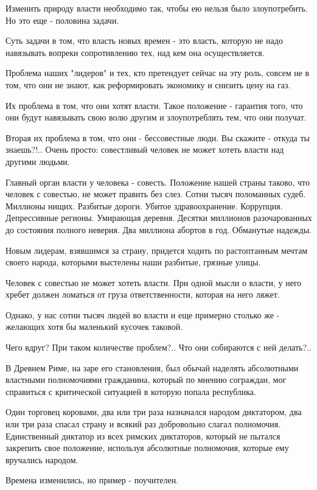 Изменить природу власти необходимо так, чтобы ею нельзя было злоупотребить. Но
это еще - половина задачи. 

Суть задачи в том, что власть новых времен - это власть, которую не надо
навязывать вопреки сопротивлению тех, над кем она осуществляется.

Проблема наших "лидеров" и тех, кто претендует сейчас на эту роль, совсем не в
том, что они не знают, как реформировать экономику и снизить цену на газ. 

Их проблема в том, что они хотят власти. Такое положение - гарантия того, что
они будут навязывать свою волю другим и злоупотреблять тем, что они получат. 

Вторая их проблема в том, что они - бессовестные люди. Вы скажите - откуда ты
знаешь?!.. Очень просто: совестливый человек не может хотеть власти над другими
людьми. 

Главный орган власти у человека - совесть. Положение нашей страны таково, что
человек с совестью, не может править без слез. Сотни тысяч поломанных судеб.
Миллионы нищих. Разбитые дороги. Убитое здравоохранение. Коррупция.
Депрессивные регионы. Умирающая деревня. Десятки миллионов разочарованных до
состояния полного неверия. Два миллиона абортов в год. Обманутые надежды. 

Новым лидерам, взявшимся за  страну, придется ходить по растоптанным мечтам
своего народа, которыми выстелены наши разбитые, грязные улицы. 

Человек с совестью не может хотеть власти. При одной мысли о власти, у него
хребет должен ломаться от груза ответственности, которая на него ляжет. 

Однако, у нас сотни тысяч людей во власти и еще примерно столько же - желающих
хотя бы маленький кусочек таковой.  

Чего вдруг? При таком количестве проблем?.. Что они собираются с ней делать?..

В Древнем Риме, на заре его становления, был обычай наделять абсолютными
властными полномочиями гражданина, который по мнению сограждан, мог справиться
с критической ситуацией в которую попала республика. 

Один торговец коровами, два или три раза назначался народом диктатором, два или
три раза спасал страну и всякий раз добровольно слагал полномочия. Единственный
диктатор из всех римских диктаторов, который не пытался закрепить свое
положение, используя абсолютные полномочия, которые ему вручались народом. 

Времена изменились, но пример - поучителен. 

